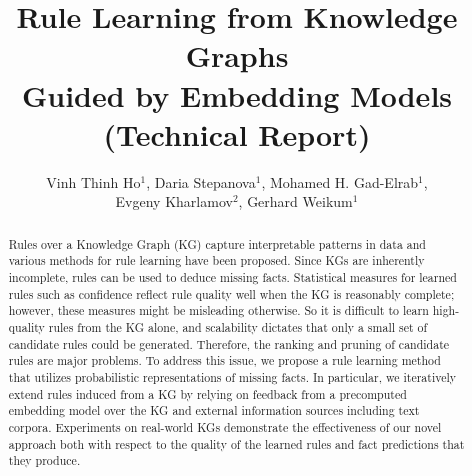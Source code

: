 \documentclass[a4paper]{llncs}
\begin{document}
%
\frontmatter          
%
\pagestyle{headings}  

\mainmatter              
%
\title{
Rule Learning from Knowledge Graphs\\ Guided by Embedding Models\\ (Technical Report)}
\titlerunning{}  

\newcommand{\authspace}{\hspace{1.5ex}}
\author{%
Vinh Thinh Ho$^{1}$,
Daria Stepanova$^{1}$,
Mohamed H. Gad-Elrab$^{1}$,\\
Evgeny Kharlamov$^{2}$,
Gerhard Weikum$^{1}$
}		


\maketitle        


\begin{abstract}

Rules over a Knowledge Graph (KG) capture 
interpretable 
patterns in data
and various methods for rule learning have been proposed. 
Since KGs are inherently incomplete,
rules can be used to deduce missing facts. 
Statistical measures for learned rules such as confidence reflect rule quality well when the KG
is reasonably complete; however, these measures might be misleading otherwise. 
So it is difficult to learn high-quality
rules from the KG alone, 
and scalability dictates that only a small set
of candidate rules could be generated.
Therefore, the ranking and pruning 
of candidate rules are major problems.
To address this issue, we propose a rule learning method that utilizes probabilistic representations of missing facts. In particular, we iteratively extend rules induced from a KG by relying on feedback from a precomputed embedding model over the KG and
external information sources including text corpora. Experiments on real-world KGs demonstrate the effectiveness of our novel approach both with respect to the quality of the learned rules and fact predictions that they produce.
\end{abstract}












\end{document}
